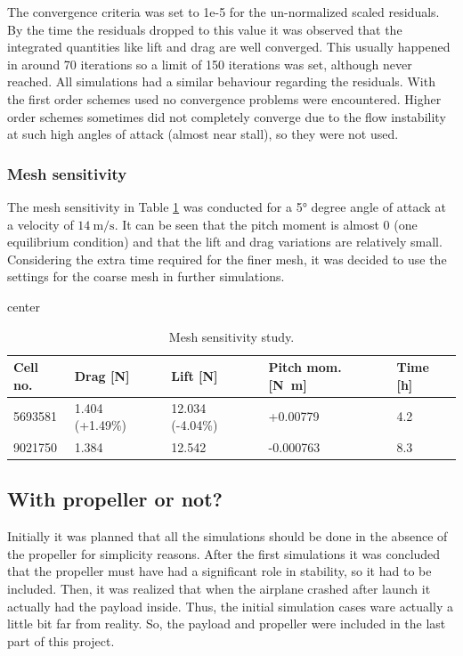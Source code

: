 \documentclass[11pt,a4paper,twoside,oneside]{article}
\newcommand{\ra}[1]{\renewcommand{\arraystretch}{#1}}
\begin{document}
The convergence criteria was set to 1e-5 for the un-normalized scaled residuals. By the time the residuals dropped to this value it was observed that the integrated quantities like lift and drag are well converged. This usually happened in around 70 iterations so a limit of 150 iterations was set, although never reached. All simulations had a similar behaviour regarding the residuals. With the first order schemes used no convergence problems were encountered. Higher order schemes sometimes did not completely converge due to the flow instability at such high angles of attack (almost near stall), so they were not used.



\subsubsection{Mesh sensitivity}
 The mesh sensitivity in Table \ref{table:meshs} was conducted for a \ang{5} degree angle of attack at a velocity of $\SI{14}{\m\per\s}$. It can be seen that the pitch moment is almost 0 (one equilibrium condition) and that the lift and drag variations are relatively small. Considering the extra time required for the finer mesh, it was decided to use the settings for the coarse mesh in further simulations.

\begin{table}[hbp]
\caption{Mesh sensitivity study.}
\centering
\begin{adjustbox}{center}
\ra{1.3}
\begin{tabular}{l l l l l}
\toprule %
Cell no. & Drag [\si{N}] & Lift [\si{N}] & Pitch mom. [\si{\N\m}] & Time [\si{h}] \\ \midrule
\num{5693581} & 1.404 (+1.49\%)  &	12.034 (-4.04\%) &  +0.00779 &	4.2     \\
  \num{9021750} & 1.384 \phantom{(+1.49\%)}  & 12.542 \phantom{(-4.04\%)}	&  -0.000763	& 8.3	\\ \bottomrule
\end{tabular}
\end{adjustbox}
\label{table:meshs}
\end{table}


\subsection{With propeller or not?}
Initially it was planned that all the simulations should be done in the absence of the propeller for simplicity reasons. After the first simulations it was concluded that the propeller must have had a significant role in stability, so it had to be included. Then, it was realized that when the airplane crashed after launch it actually had the payload inside. Thus, the initial simulation cases ware actually a little bit far from reality. So, the payload and propeller were included in the last part of this project. 
\end{document}
